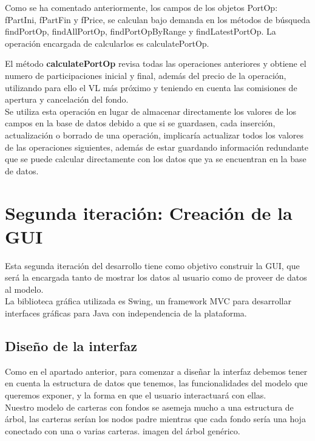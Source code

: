 \documentclass[12pt, a4paper]{book}
\begin{document}
Como se ha comentado anteriormente, los campos de los objetos PortOp:  fPartIni, fPartFin y fPrice, se calculan bajo demanda en los métodos de búsqueda findPortOp, findAllPortOp, findPortOpByRange y findLatestPortOp. La operación encargada de calcularlos es calculatePortOp.\\

\newpage

El método \textbf{calculatePortOp} revisa todas las operaciones anteriores y obtiene el numero de participaciones inicial y final, además del precio de la operación, utilizando para ello el \gls{VL} más próximo y teniendo en cuenta las comisiones de apertura y cancelación del fondo.\\

Se utiliza esta operación en lugar de almacenar directamente los valores de los campos en la base de datos debido a que si se guardasen, cada inserción, actualización o borrado de una operación, implicaría actualizar todos los valores de las operaciones siguientes, además de estar guardando información redundante que se puede calcular directamente con los datos que ya se encuentran en la base de datos.



\newpage
\section{Segunda iteración: Creación de la GUI}

Esta segunda iteración del desarrollo tiene como objetivo construir la \gls{GUI}, que será la encargada tanto de mostrar los datos al usuario como de proveer de datos al modelo.
\\

La biblioteca gráfica utilizada es Swing, un framework MVC para desarrollar interfaces gráficas para Java con independencia de la plataforma.

\subsection{Diseño de la interfaz}

Como en el apartado anterior, para comenzar a diseñar la interfaz debemos tener en cuenta la estructura de datos que tenemos, las funcionalidades del modelo que queremos exponer, y la forma en que el usuario interactuará con ellas.
\\

Nuestro modelo de carteras con fondos se asemeja mucho a una estructura de árbol, las carteras serían los nodos padre mientras que cada fondo sería una hoja conectado con una o varias carteras. imagen del árbol genérico.
\\
\end{document}
